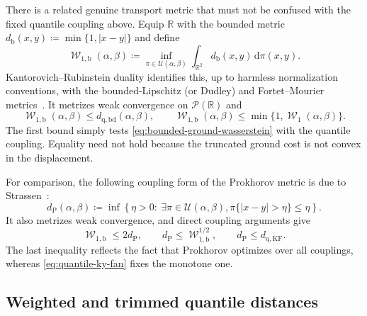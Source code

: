 \documentclass[11pt]{article}
\newcommand{\RR}{\mathbb R}
\newcommand{\Pp}{\mathcal P}
\renewcommand{\d}{\,\mathrm d}
\newcommand{\al}{\alpha}
\newcommand{\be}{\beta}
\DeclareMathOperator{\Wass}{\mathcal W}
\newcommand{\Couplings}{\mathcal U}
\newcommand{\eqdef}{\coloneqq}
\begin{document}
There is a related genuine transport metric that must not be confused with
the fixed quantile coupling above.  Equip $\RR$ with the bounded metric
$d_{\mathrm b}(x,y)\eqdef\min\{1,|x-y|\}$ and define
\begin{equation}\label{eq:bounded-ground-wasserstein}
 \Wass_{1,\mathrm b}(\al,\be)
 \eqdef\inf_{\pi\in\Couplings(\al,\be)}
 \int_{\RR^2}d_{\mathrm b}(x,y)\d\pi(x,y).
\end{equation}
Kantorovich--Rubinstein duality identifies this, up to harmless normalization
conventions, with the bounded-Lipschitz (or Dudley) and Fortet--Mourier
metrics~\cite{FortetMourier1953,Dudley1968,GibbsSu2002}.  It metrizes weak convergence on
$\Pp(\RR)$ and
\begin{equation}\label{eq:bounded-ground-comparisons}
 \Wass_{1,\mathrm b}(\al,\be)
 \leq d_{\mathrm{q,bd}}(\al,\be),
 \qquad
 \Wass_{1,\mathrm b}(\al,\be)
 \leq\min\{1,\Wass_1(\al,\be)\}.
\end{equation}
The first bound simply tests \eqref{eq:bounded-ground-wasserstein} with the
quantile coupling.  Equality need not hold because the truncated ground cost
is not convex in the displacement.

For comparison, the following coupling form of the Prokhorov metric is due to
Strassen~\cite{Strassen1965,Billingsley1999}:
\begin{equation}\label{eq:prokhorov-coupling}
 d_{\mathrm P}(\al,\be)
 \eqdef\inf\left\{\eta>0:\ \exists\pi\in\Couplings(\al,\be),
 \pi\{|x-y|>\eta\}\leq\eta\right\}.
\end{equation}
It also metrizes weak convergence, and direct coupling arguments give
\begin{equation}\label{eq:prokhorov-bounded-ground}
 \Wass_{1,\mathrm b}\leq2d_{\mathrm P},
 \qquad
 d_{\mathrm P}\leq\Wass_{1,\mathrm b}^{1/2},
 \qquad
 d_{\mathrm P}\leq d_{\mathrm{q,KF}}.
\end{equation}
The last inequality reflects the fact that Prokhorov optimizes over all
couplings, whereas \eqref{eq:quantile-ky-fan} fixes the monotone one.

\subsection{Weighted and trimmed quantile distances}
\end{document}
